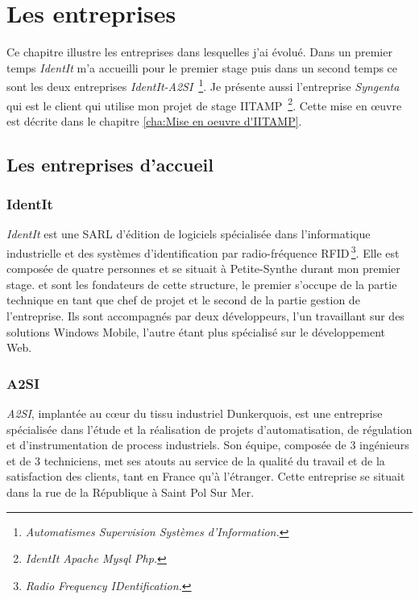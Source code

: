 \chapter{Les entreprises} %
\label{cha:Les entreprises}


\begin{it}

Ce chapitre illustre les entreprises dans lesquelles j'ai évolué. Dans
un premier temps \emph{IdentIt} m'a accueilli pour le premier stage puis
dans un second temps ce sont les deux entreprises \emph{IdentIt-A2SI}\,
\footnote{\emph{Automatismes Supervision Systèmes d'Information.}}.  Je
présente aussi l'entreprise \emph{Syngenta} qui est le client qui
utilise mon projet de stage IITAMP\, \footnote{\emph{IdentIt Apache
Mysql Php.}}. Cette mise en \oe{}uvre est décrite dans le chapitre
\ref{cha:Mise en oeuvre d'IITAMP}.

\end{it}

\section{Les entreprises d'accueil} %
\label{sec:Les entreprises d'accueil}

\subsection{IdentIt} %
\label{sub:IdentIt}

\emph{IdentIt} est une SARL d'édition de logiciels spécialisée dans
l'informatique industrielle et des systèmes d'identification par
radio-fréquence RFID\,\footnote{\emph{Radio Frequency IDentification.}}.
Elle est composée de quatre personnes et se situait à Petite-Synthe
durant mon premier stage.  et  sont les
fondateurs de cette structure, le premier s'occupe de la partie
technique en tant que chef de projet et le second de la partie gestion
de l'entreprise. Ils sont accompagnés par deux développeurs, l'un
travaillant sur des solutions Windows Mobile, l'autre étant plus
spécialisé sur le développement Web.


\subsection{A2SI} %
\label{sub:A2SI}

\emph{A2SI}, implantée au c\oe{}ur du tissu industriel Dunkerquois, est
une entreprise spécialisée dans l’étude et la réalisation de projets
d’automatisation, de régulation et d’instrumentation de process
industriels. Son équipe, composée de 3 ingénieurs et de 3 techniciens,
met ses atouts au service de la qualité du travail et de la satisfaction
des clients, tant en France qu’à l’étranger. Cette entreprise se situait
dans la rue de la République à Saint Pol Sur Mer.

